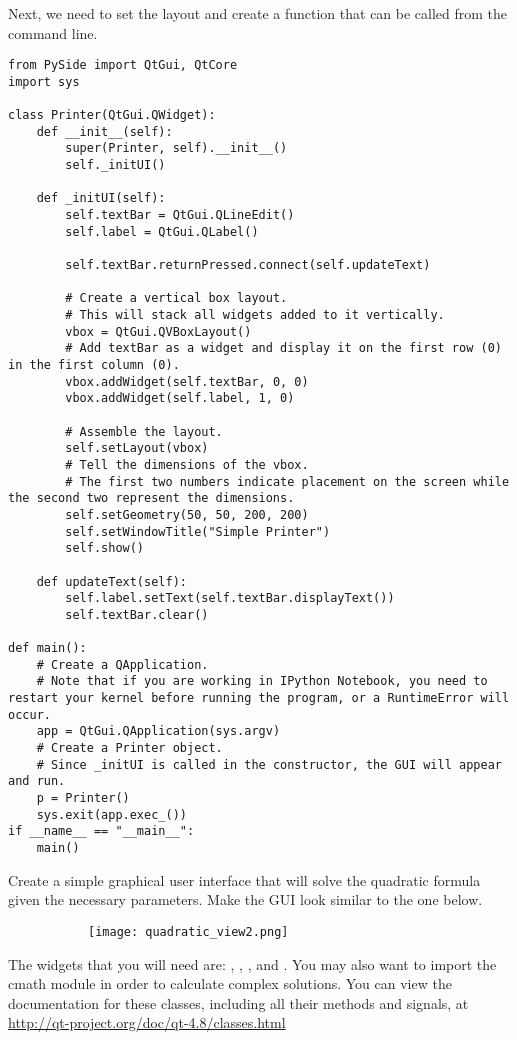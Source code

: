 Next, we need to set the layout and create a function that can be called from the command line.

\begin{lstlisting}
from PySide import QtGui, QtCore
import sys

class Printer(QtGui.QWidget):
	def __init__(self):
		super(Printer, self).__init__()
		self._initUI()

	def _initUI(self):
		self.textBar = QtGui.QLineEdit()
		self.label = QtGui.QLabel()

		self.textBar.returnPressed.connect(self.updateText)

		# Create a vertical box layout.
		# This will stack all widgets added to it vertically.
		vbox = QtGui.QVBoxLayout()
		# Add textBar as a widget and display it on the first row (0) in the first column (0).
        vbox.addWidget(self.textBar, 0, 0)
		vbox.addWidget(self.label, 1, 0)

		# Assemble the layout.
		self.setLayout(vbox)
		# Tell the dimensions of the vbox.
		# The first two numbers indicate placement on the screen while the second two represent the dimensions.
		self.setGeometry(50, 50, 200, 200)
		self.setWindowTitle("Simple Printer")
		self.show()

	def updateText(self):
		self.label.setText(self.textBar.displayText())
		self.textBar.clear()

def main():
	# Create a QApplication.
    # Note that if you are working in IPython Notebook, you need to restart your kernel before running the program, or a RuntimeError will occur.
	app = QtGui.QApplication(sys.argv)
	# Create a Printer object.
    # Since _initUI is called in the constructor, the GUI will appear and run.
	p = Printer()
	sys.exit(app.exec_())
if __name__ == "__main__":
	main()

\end{lstlisting}

\begin{problem}
Create a simple graphical user interface that will solve the quadratic formula given the necessary parameters.
Make the GUI look similar to the one below.
\begin{figure}[H]
\centering
\begin{comment}
\begin{subfigure}[b]{.49\textwidth}
\texttt{[image: quadratic\_view.png]}
\end{subfigure}
\end{comment}
\begin{subfigure}[b]{.49\textwidth}
\texttt{[image: quadratic\_view2.png]}
\end{subfigure}
\end{figure}
The widgets that you will need are: , , , and . You may also want to import the cmath module in order to calculate complex solutions.
You can view the documentation for these classes, including all their methods and signals, at \url{http://qt-project.org/doc/qt-4.8/classes.html}
\label{prob:quadCalc}
\end{problem}


